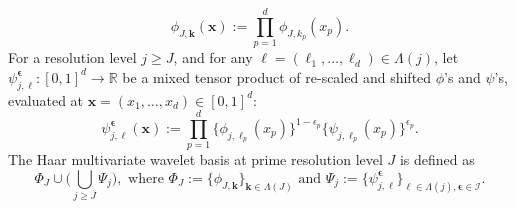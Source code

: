 \documentclass[twoside,11pt]{article}
\newcommand{\vectorize}[1]{\mathbf{#1}}
\newcommand{\dimDensity}{d} %
\newcommand{\dimensionIndex}{p}
\newcommand{\wavFatherFunc}{\phi}
\newcommand{\wavMotherFunc}{\psi} %
\newcommand{\resLev}{j}
\newcommand{\primResLev}{J}
\newcommand{\wavFatherUnivIndex}{k}
\newcommand{\wavFatherIndex}{\boldsymbol{\wavFatherUnivIndex}}
\newcommand{\wavMotherUnivIndex}{\ell}
\newcommand{\wavMotherIndex}{\boldsymbol{\wavMotherUnivIndex}}
\newcommand{\wavMotherBooleanUnivIndex}{\epsilon}
\newcommand{\wavMotherBooleanIndex}{\mathbf{\wavMotherBooleanUnivIndex}}
\begin{document}
\begin{appendix}
	\begin{equation*}
		\wavFatherFunc_{\primResLev, \wavFatherIndex}(\vectorize{x})
		:=
		\prod_{\dimensionIndex = 1}^{\dimDensity}
		\wavFatherFunc_{\primResLev, \wavFatherUnivIndex_\dimensionIndex}(x_\dimensionIndex).
	\end{equation*}
	For a resolution level $\resLev \geq \primResLev$, and for any $\wavMotherIndex = (\ell_1, \ldots, \ell_\dimDensity) \in \Lambda(\resLev)$,
	let $
	\wavMotherFunc_{\resLev, \wavMotherIndex}^{\wavMotherBooleanIndex}
	:
	[0,1]^\dimDensity \to \mathbb{R}
	$
	be a mixed tensor product of re-scaled and shifted $\wavFatherFunc$'s and $\wavMotherFunc$'s, evaluated at $\mathbf{x} = (x_1, \ldots, x_\dimDensity) \in [0,1]^\dimDensity$:
	\begin{equation*}
		\wavMotherFunc_{\resLev, \wavMotherIndex}^{\wavMotherBooleanIndex}
		(\vectorize{x})
		:=
		\prod_{{\dimensionIndex}=1}^\dimDensity
		\bigl\{
		\wavFatherFunc_{\resLev, \wavMotherUnivIndex_\dimensionIndex}
		(x_\dimensionIndex)
		\bigr\}^{1-\wavMotherBooleanUnivIndex_\dimensionIndex}
		\bigl\{
		\wavMotherFunc_{\resLev, \wavMotherUnivIndex_\dimensionIndex}
		(x_\dimensionIndex)
		\bigr\}^{\wavMotherBooleanUnivIndex_{\dimensionIndex}}.
	\end{equation*}
	The Haar multivariate wavelet basis at prime resolution level $\primResLev$ is defined as 
	\begin{equation}\label{appendix:def:haar_daughter}
		\Phi_{\primResLev}
		\cup
		\bigl(
		\bigcup_{\resLev \geq \primResLev}
		\Psi_{\resLev} 
		\bigr),
		\text{ where }\Phi_{\primResLev}
		:=
		\{\wavFatherFunc_{\primResLev, \wavFatherIndex}\}_{\wavFatherIndex \in \Lambda(\primResLev)}
		\text{ and }
		\Psi_{\resLev}
		:=
		\{
		\wavMotherFunc_{\resLev, \wavMotherIndex}^{\wavMotherBooleanIndex}
		\}_{
			\wavMotherIndex \in \Lambda(\resLev),
			\wavMotherBooleanIndex \in \mathcal{I}
		}.
	\end{equation}
	
	

\end{appendix}
\end{document}
